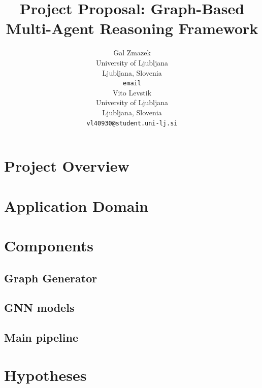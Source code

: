 \documentclass{article}
\title{Project Proposal: Graph-Based Multi-Agent Reasoning Framework}
\author{
    Gal Zmazek \\
    University of Ljubljana \\
    Ljubljana, Slovenia \\
    \texttt{email} \\
    \And
    Vito Levstik \\
    University of Ljubljana \\
    Ljubljana, Slovenia \\
    \texttt{vl40930@student.uni-lj.si} \\
}
\begin{document}
\maketitle


\section{Project Overview}

\section{Application Domain}

\section{Components}
\subsection{Graph Generator}
\subsection{GNN models}
\subsection{Main pipeline}

\section{Hypotheses}
\end{document}
